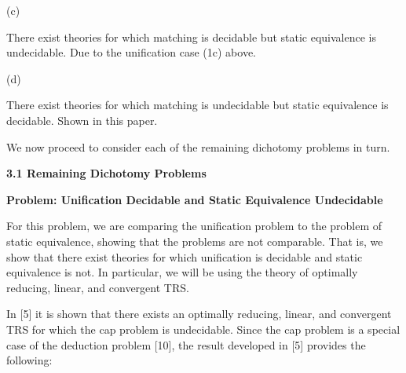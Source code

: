 \documentclass[10pt,a4paper]{amsart}
\begin{document}
 
 
\par\noindent  (c) 
 
There exist theories for which matching is decidable but static equivalence is undecidable. Due to the unification case (1c) above.\par
 
 
 
\par\noindent  (d) 
 
There exist theories for which matching is undecidable but static equivalence is decidable. Shown in this paper.\par
 
 
  
 
  
 
 
We now proceed to consider each of the remaining dichotomy problems in turn.\par
 
 
 
\par\medskip\noindent\textbf{3.1 Remaining Dichotomy Problems}\par
 
 
\par\medskip\noindent\textbf{Problem: Unification Decidable and Static Equivalence Undecidable}\par
 
 
For this problem, we are comparing the unification problem to the problem of static equivalence, showing that the problems are not comparable. That is, we show that there exist theories for which unification is decidable and static equivalence is not. In particular, we will be using the theory of optimally reducing, linear, and convergent TRS.\par
 
 
 
In [5] it is shown that there exists an optimally reducing, linear, and convergent TRS for which the cap problem is undecidable. Since the cap problem is a special case of the deduction problem [10], the result developed in [5] provides the following:\par
 
\end{document}
